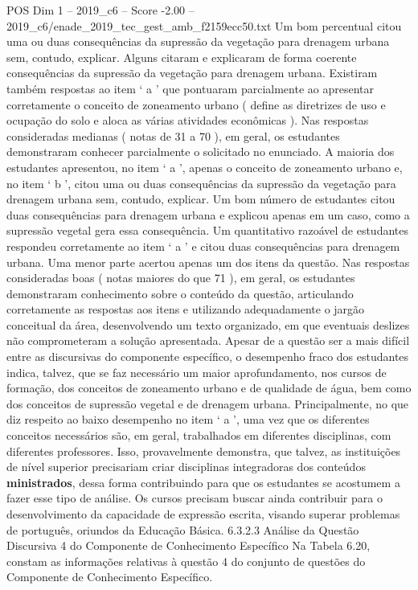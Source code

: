 \begin{textsample}{POS Dim 1 – 2019\_c6 – Score -2.00 – 2019\_c6/enade\_2019\_tec\_gest\_amb\_f2159ecc50.txt}
Um bom percentual citou uma ou duas consequências da supressão da vegetação para drenagem urbana sem, contudo, explicar.
Alguns citaram e explicaram de forma coerente consequências da supressão da vegetação para drenagem urbana.
Existiram também respostas ao item ‘ a ’ que pontuaram parcialmente ao apresentar corretamente o conceito de zoneamento urbano ( define as diretrizes de uso e ocupação do solo e aloca as várias atividades econômicas ).
Nas respostas consideradas medianas ( notas de 31 a 70 ), em geral, os estudantes demonstraram conhecer parcialmente o solicitado no enunciado.
A maioria dos estudantes apresentou, no item ‘ a ’, apenas o conceito de zoneamento urbano e, no item ‘ b ’, citou uma ou duas consequências da supressão da vegetação para drenagem urbana sem, contudo, explicar.
Um bom número de estudantes citou duas consequências para drenagem urbana e explicou apenas em um caso, como a supressão vegetal gera essa consequência.
Um quantitativo razoável de estudantes respondeu corretamente ao item ‘ a ’ e citou duas consequências para drenagem urbana.
Uma menor parte acertou apenas um dos itens da questão.
Nas respostas consideradas boas ( notas maiores do que 71 ), em geral, os estudantes demonstraram conhecimento sobre o conteúdo da questão, articulando corretamente as respostas aos itens e utilizando adequadamente o jargão conceitual da área, desenvolvendo um texto organizado, em que eventuais deslizes não comprometeram a solução apresentada.
Apesar de a questão ser a mais difícil entre as discursivas do componente específico, o desempenho fraco dos estudantes indica, talvez, que se faz necessário um maior aprofundamento, nos cursos de formação, dos conceitos de zoneamento urbano e de qualidade de água, bem como dos conceitos de supressão vegetal e de drenagem urbana.
Principalmente, no que diz respeito ao baixo desempenho no item ‘ a ’, uma vez que os diferentes conceitos necessários são, em geral, trabalhados em diferentes disciplinas, com diferentes professores.
Isso, provavelmente demonstra, que talvez, as instituições de nível superior precisariam criar disciplinas integradoras dos conteúdos \textbf{ministrados}, dessa forma contribuindo para que os estudantes se acostumem a fazer esse tipo de análise.
Os cursos precisam buscar ainda contribuir para o desenvolvimento da capacidade de expressão escrita, visando superar problemas de português, oriundos da Educação Básica. 6.3.2.3 Análise da Questão Discursiva 4 do Componente de Conhecimento Específico Na Tabela 6.20, constam as informações relativas à questão 4 do conjunto de questões do Componente de Conhecimento Específico.

\end{textsample}
